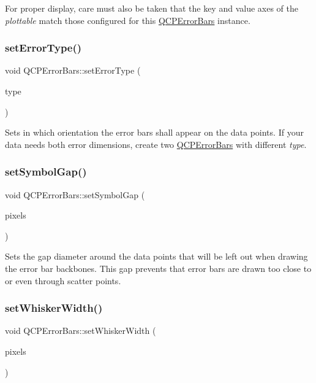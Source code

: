 For proper display, care must also be taken that the key and value axes of the {\itshape plottable} match those configured for this \mbox{\hyperlink{class_q_c_p_error_bars}{Q\+C\+P\+Error\+Bars}} instance. \mbox{\label{class_q_c_p_error_bars_af0af493d454a8f3a0908830160680d2b}} 
\subsubsection{\texorpdfstring{setErrorType()}{setErrorType()}}
{\footnotesize\ttfamily void Q\+C\+P\+Error\+Bars\+::set\+Error\+Type (\begin{DoxyParamCaption}\item[{\mbox{\hyperlink{class_q_c_p_error_bars_a95f0220f11a72648b96480a85ce26474}{Error\+Type}}}]{type }\end{DoxyParamCaption})}

Sets in which orientation the error bars shall appear on the data points. If your data needs both error dimensions, create two \mbox{\hyperlink{class_q_c_p_error_bars}{Q\+C\+P\+Error\+Bars}} with different {\itshape type}. \mbox{\label{class_q_c_p_error_bars_a280ee8d863d8a2630c309701d019b3de}} 
\subsubsection{\texorpdfstring{setSymbolGap()}{setSymbolGap()}}
{\footnotesize\ttfamily void Q\+C\+P\+Error\+Bars\+::set\+Symbol\+Gap (\begin{DoxyParamCaption}\item[{double}]{pixels }\end{DoxyParamCaption})}

Sets the gap diameter around the data points that will be left out when drawing the error bar backbones. This gap prevents that error bars are drawn too close to or even through scatter points. \mbox{\label{class_q_c_p_error_bars_ad05f6ff9e46c6047f1cd2459744b7b59}} 
\subsubsection{\texorpdfstring{setWhiskerWidth()}{setWhiskerWidth()}}
{\footnotesize\ttfamily void Q\+C\+P\+Error\+Bars\+::set\+Whisker\+Width (\begin{DoxyParamCaption}\item[{double}]{pixels }\end{DoxyParamCaption})}

